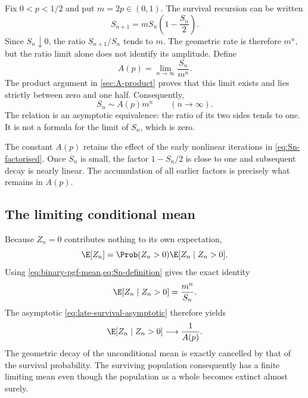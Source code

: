 Fix \(0<p<1/2\) and put \(m=2p\in(0,1)\).  The survival recursion can be written
\begin{equation}
  S_{n+1}=mS_n\left(1-\frac{S_n}{2}\right).
  \label{eq:Sn-factorised}
\end{equation}
Since \(S_n\downarrow0\), the ratio \(S_{n+1}/S_n\) tends to \(m\).  The geometric
rate is therefore \(m^n\), but the ratio limit alone does not identify its
amplitude.  Define
\begin{equation}
  A(p)=\lim_{n\to\infty}\frac{S_n}{m^n}.
  \label{eq:A-definition}
\end{equation}
The product argument in \cref{sec:A-product} proves that this limit exists and lies
strictly between zero and one half.  Consequently,
\begin{equation}
  S_n\sim A(p)m^n
  \qquad(n\to\infty).
  \label{eq:late-survival-asymptotic}
\end{equation}
The relation is an asymptotic equivalence: the ratio of its two sides tends to one.
It is not a formula for the limit of \(S_n\), which is zero.

The constant \(A(p)\) retains the effect of the early nonlinear iterations in
\cref{eq:Sn-factorised}.  Once \(S_n\) is small, the factor \(1-S_n/2\) is close to
one and subsequent decay is nearly linear.  The accumulation of all earlier factors
is precisely what remains in \(A(p)\).

\subsection{The limiting conditional mean}
\label{sec:qsd-mean}

Because \(Z_n=0\) contributes nothing to its own expectation,
\begin{equation}
  \E[Z_n]
  =\Prob(Z_n>0)\E[Z_n\mid Z_n>0].
\end{equation}
Using \cref{eq:binary-pgf-mean,eq:Sn-definition} gives the exact identity
\begin{equation}
  \E[Z_n\mid Z_n>0]=\frac{m^n}{S_n}.
  \label{eq:conditional-mean-exact}
\end{equation}
The asymptotic \cref{eq:late-survival-asymptotic} therefore yields
\begin{equation}
  \E[Z_n\mid Z_n>0]\longrightarrow\frac{1}{A(p)}.
  \label{eq:qsd-mean}
\end{equation}
The geometric decay of the unconditional mean is exactly cancelled by that of the
survival probability.  The surviving population consequently has a finite limiting
mean even though the population as a whole becomes extinct almost surely.

